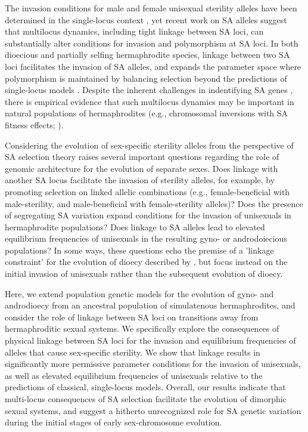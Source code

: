 \documentclass[9pt,twocolumn,twoside,lineno]{gsajnl}
\begin{document}
The invasion conditions for male and female unisexual sterility alleles have been determined in the single-locus context \citep{Charlesworth1978a}, yet recent work on SA alleles suggest that multilocus dynamics, including tight linkage between SA loci, can substantially alter conditions for invasion and polymorphism at SA loci. In both dioecious and partially selfing hermaphrodite species, linkage between two SA loci facilitates the invasion of SA alleles, and expands the parameter space where polymorphism is maintained by balancing selection beyond the predictions of single-locus models \citep{Kidwell1977,Patten2010,UbedaPatten2010,Olito2017}. Despite the inherent challenges in indentifying SA genes \citep{ConnallonClark2012,Barson2015}, there is empirical evidence that such multilocus dynamics may be important in natural populations of hermaphrodites (e.g., chromosomal inversions with SA fitness effects; \citealt{LeeKelly2015}).

Considering the evolution of sex-specific sterility alleles from the perspective of SA selection theory raises several important questions regarding the role of genomic architecture for the evolution of separate sexes. Does linkage with another SA locus facilitate the invasion of sterility alleles, for example, by promoting selection on linked allelic combinations (e.g., female-beneficial with male-sterility, and male-beneficial with female-sterility alleles)? Does the presence of segregating SA variation expand conditions for the invasion of unisexuals in hermaphrodite populations? Does linkage to SA alleles lead to elevated equilibrium frequencies of unisexuals in the resulting gyno- or androdoiecious populations? In some ways, these questions echo the premise of a 'linkage constraint' for the evolution of dioecy described by \citet{Charlesworth1978a}, but focus instead on the initial invasion of unisexuals rather than the subsequent evolution of dioecy. 

Here, we extend population genetic models for the evolution of gyno- and androdioecy from an ancestral population of simulatenous hermaphrodites, and consider the role of linkage between SA loci on transitions away from hermaphroditic sexual systems. We specifically explore the consequences of physical linkage between SA loci for the invasion and equilibrium frequencies of alleles that cause sex-specific sterility. We show that linkage results in significantly more permissive parameter conditions for the invasion of unisexuals, as well as elevated equilibrium frequencies of unisexuals relative to the predictions of classical, single-locus models. Overall, our results indicate that multi-locus consequences of SA selection facilitate the evolution of dimorphic sexual systems, and suggest a hitherto unrecognized role for SA genetic variation during the initial stages of early sex-chromosome evolution.
\end{document}
